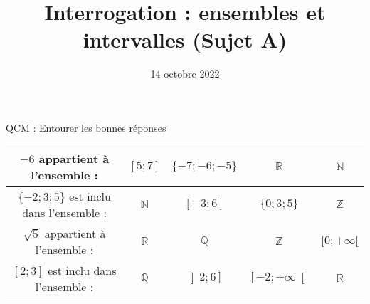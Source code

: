 \documentclass[
	classe=$2^{de}$,
	headerTitle=Interrogation\space Chapitre\space 2
]{évaluation}
\title{Interrogation : ensembles et intervalles (Sujet A)}
\date{14 octobre 2022}
\newcommand{\intervalle}[4]{\left#1 #2;#3\right#4}
\newcommand{\correctionEntoure}[1]{%
\ifdefined\makeCorrection%
\squared[red]{#1}
\else%
#1
\fi}
\begin{document}
\maketitle

\begin{exercice} QCM : Entourer les bonnes réponses \vspace{1em}

	\begin{center}
		\begin{tabular}{|c|c|c|c|c|}
			\hline
			$-6$ appartient à l'ensemble :                        & $\intervalle{[}{5}{7}{]}$ & \correctionEntoure{$\{-7; -6;-5\}$}            & \correctionEntoure{$ℝ$}                         & $ℕ$                           \\ \hline
			$\{-2; 3; 5\}$ est inclu dans l'ensemble :            & $ℕ$                       & \correctionEntoure{$\intervalle{[}{-3}{6}{]}$} & $\{0; 3; 5\}$                                   & \correctionEntoure{$ℤ$}       \\ \hline
			$\sqrt{5}$ appartient à l'ensemble :                  & \correctionEntoure{$ℝ$}   & $ℚ$                                            & $ℤ$                                             & \correctionEntoure{$[0; +∞[$} \\ \hline
			$\intervalle{[}{2}{3}{]}$ est inclu dans l'ensemble : & $ℚ$                       & $\intervalle{]}{2}{6}{]}$                      & \correctionEntoure{$\intervalle{[}{-2}{+∞}{[}$} & \correctionEntoure{$ℝ$}       \\ \hline
		\end{tabular}
	\end{center}
\end{exercice}
\end{document}
